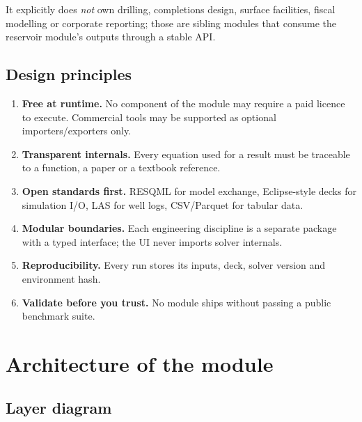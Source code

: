 \documentclass[11pt,a4paper]{article}
\begin{document}
It explicitly does \emph{not} own drilling, completions design, surface
facilities, fiscal modelling or corporate reporting; those are sibling
modules that consume the reservoir module's outputs through a stable API.

\subsection{Design principles}
\begin{enumerate}[leftmargin=1.4em]
  \item \textbf{Free at runtime.} No component of the module may require a
        paid licence to execute. Commercial tools may be supported as
        optional importers/exporters only.
  \item \textbf{Transparent internals.} Every equation used for a result must
        be traceable to a function, a paper or a textbook reference.
  \item \textbf{Open standards first.} RESQML for model exchange, Eclipse-style
        decks for simulation I/O, LAS for well logs, CSV/Parquet for tabular
        data.
  \item \textbf{Modular boundaries.} Each engineering discipline is a separate
        package with a typed interface; the UI never imports solver internals.
  \item \textbf{Reproducibility.} Every run stores its inputs, deck, solver
        version and environment hash.
  \item \textbf{Validate before you trust.} No module ships without passing a
        public benchmark suite.
\end{enumerate}

\section{Architecture of the module}

\subsection{Layer diagram}
\end{document}
